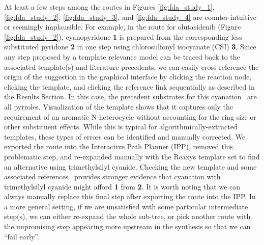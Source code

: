 \documentclass[pdflatex,sn-mathphys-num]{sn-jnl}%
\theoremstyle{thmstyleone}%
\theoremstyle{thmstyletwo}%
\theoremstyle{thmstylethree}%
\begin{document}
At least a few steps among the routes in Figures \ref{fig:fda_study_1}, \ref{fig:fda_study_2}, \ref{fig:fda_study_3}, and \ref{fig:fda_study_4} are counter-intuitive or seemingly implausible. For example, in the route for olutasidenib (Figure \ref{fig:fda_study_2}), cyanopyridone \textbf{1} is prepared from the corresponding less substituted pyridone \textbf{2} in one step using chlorosulfonyl isocyanate (CSI) \textbf{3}. Since any step proposed by a template relevance model can be traced back to the associated template(s) and literature precedents, we can easily cross-reference the origin of the suggestion in the graphical interface by clicking the reaction node, clicking the template, and clicking the reference link sequentially as described in the Results Section. In this case, the precedent substrates for this cyanation~\citep{anderson_pyrrole_1985,elliott_intramolecular_2007,koovits_conformationally_2016} are all pyrroles. Visualization of the template shows that it captures only the requirement of an aromatic N-heterocycle without accounting for the ring size or other substituent effects. While this is typical for algorithmically-extracted templates, these types of errors can be identified and manually corrected. We exported the route into the Interactive Path Planner (IPP), removed this problematic step, and re-expanded manually with the Reaxys template set to find an alternative using trimethylsilyl cyanide. Checking the new template and some associated references~\citep{boogaard_ring_1994,ornstein_4-tetrazolylalkylpiperidine-2-carboxylic_1991,price_orally_2018} provides stronger evidence that cyanation with trimethylsilyl cyanide might afford \textbf{1} from \textbf{2}. It is worth noting that we can always manually replace this final step after exporting the route into the IPP. In a more general setting, if we are unsatisfied with some particular intermediate step(s), we can either re-expand the whole sub-tree, or pick another route with the unpromising step appearing more upstream in the synthesis so that we can ``fail early''.

\end{document}
